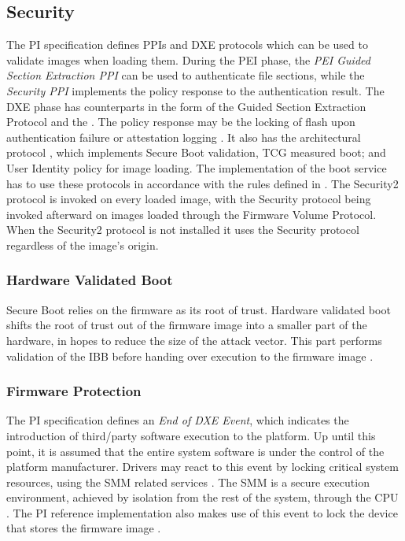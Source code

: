 
\subsection{Security}
\label{sec:uefi-pi:pi:security}

The \ac{PI} specification defines \acp{PPI} and \ac{DXE} protocols which can be used to validate images when loading them.
During the \ac{PEI} phase, the \emph{\ac{PEI} Guided Section Extraction \ac{PPI}} can be used to authenticate file sections, while the \emph{Security \ac{PPI}} implements the policy response to the authentication result.
The \ac{DXE} phase has counterparts in the form of the Guided Section Extraction Protocol and the .
The policy response may be the locking of flash upon authentication failure or attestation logging \cite[Vol. 2, Section 12.9.1]{pi-spec}.
It also has the architectural protocol , which implements Secure Boot validation, \ac{TCG} measured boot; and User Identity policy for image loading.
The implementation of the boot service  has to use these protocols in accordance with the rules defined in \cite[Vol. 2, Section 12.9.2]{pi-spec}.
The Security2 protocol is invoked on every loaded image, with the Security protocol being invoked afterward on images loaded through the Firmware Volume Protocol.
When the Security2 protocol is not installed it uses the Security protocol regardless of the image's origin.

\subsubsection{Hardware Validated Boot}

Secure Boot relies on the firmware as its root of trust.
Hardware validated boot shifts the root of trust out of the firmware image into a smaller part of the hardware, in hopes to reduce the size of the attack vector.
This part performs validation of the \ac{IBB} before handing over execution to the firmware image \cite{tianocore-understanding-uefi-secure-boot-chain}.

\subsubsection{Firmware Protection}

The \ac{PI} specification defines an \emph{End of \acs{DXE} Event}, which indicates the introduction of third\-/party software execution to the platform.
Up until this point, it is assumed that the entire system software is under the control of the platform manufacturer.
Drivers may react to this event by locking critical system resources, using the \ac{SMM} related services \cite[Vol. 2, 5.1.2.1]{pi-spec}.
The \ac{SMM} is a secure execution environment, achieved by isolation from the rest of the system, through the \ac{CPU} \cite[Vol. 4, Section 1.3]{pi-spec}.
The \ac{PI} reference implementation also makes use of this event to lock the device that stores the firmware image \cite{tianocore-edk2-fmpdxe}.
